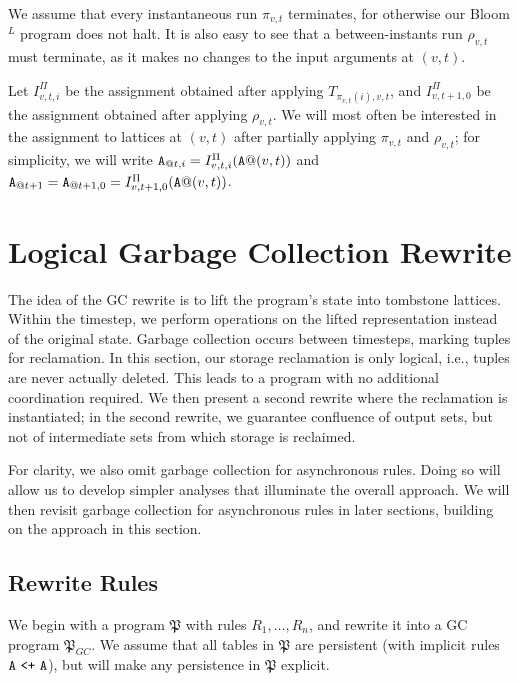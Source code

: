 \documentclass{article}
\numberwithin{equation}{section}
\renewcommand{\tt}[1]{\ifmmode\text{\texttt{#1}}\else\texttt{#1}\fi}
\begin{document}
We assume that every instantaneous run $\pi_{v,t}$ terminates, for otherwise our Bloom$^L$ program does not halt.
It is also easy to see that a between-instants run $\rho_{v,t}$ must terminate, as it makes no changes to the input arguments at $(v,t)$.

Let $I^\Pi_{v,t,i}$ be the assignment obtained after applying $T_{\pi_{v,t}(i),v,t}$, and $I^\Pi_{v,t+1,0}$ be the assignment obtained after applying $\rho_{v,t}$.
We will most often be interested in the assignment to lattices at $(v,t)$ after partially applying $\pi_{v,t}$ and $\rho_{v,t}$;
for simplicity, we will write $\tt{A}_{@t,i} = I^\Pi_{v,t,i}(\tt{A}@(v,t))$ and $\tt{A}_{@t+1} = \tt{A}_{@t+1,0} = I^\Pi_{v,t+1,0}(\tt{A}@(v,t))$.



\section{Logical Garbage Collection Rewrite}
The idea of the GC rewrite is to lift the program's state into tombstone lattices.
Within the timestep, we perform operations on the lifted representation instead of the original state.
Garbage collection occurs between timesteps, marking tuples for reclamation.
In this section, our storage reclamation is only logical, i.e., tuples are never actually deleted.
This leads to a program with no additional coordination required.
We then present a second rewrite where the reclamation is instantiated; in the second rewrite, we guarantee confluence of output sets, but not of intermediate sets from which storage is reclaimed.

For clarity, we also omit garbage collection for asynchronous rules.
Doing so will allow us to develop simpler analyses that illuminate the overall approach.
We will then revisit garbage collection for asynchronous rules in later sections, building on the approach in this section.

\subsection{Rewrite Rules}
We begin with a program $\mathfrak{P}$ with rules $R_1, \dots, R_n$, and rewrite it into a GC program $\mathfrak{P}_{GC}$.
We assume that all tables in $\mathfrak{P}$ are persistent (with implicit rules $\tt{A} ~\tt{<+}~ \tt{A}$), but will make any persistence in $\mathfrak{P}$ explicit.

\setcounter{subsubsection}{-1}
\end{document}
